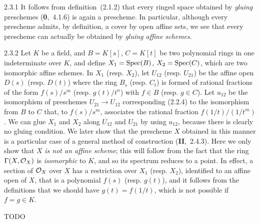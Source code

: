 \documentclass[../main.tex]{subfiles}
\begin{document}
\begin{cx}{2.3.1}
    It follows from definition~(2.1.2) that every ringed space obtained by \emph{gluing} preschemes (\textbf{0},~4.1.6) is again a prescheme.
    In particular, although every prescheme admits, by definition, a cover by open affine sets, we see that every prescheme can actually be obtained by \emph{gluing affine schemes}.
\end{cx}

\begin{cx}[Example]{2.3.2}
    Let $K$ be a field, and $B=K[s]$, $C=K[t]$ be two polynomial rings in one indeterminate over $K$, and define $X_1=\operatorname*{Spec}(B)$, $X_2=\operatorname*{Spec}(C)$, which are two isomorphic affine schemes.
    In $X_1$ (resp. $X_2$), let $U_{12}$ (resp. $U_{21}$) be the affine open $D(s)$ (resp. $D(t)$) where the ring $B_s$ (resp. $C_t$) is formed of rational fractions of the form $f(s)/s^m$ (resp. $g(t)/t^n$) with $f\in B$ (resp. $g\in C$).
    Let $u_{12}$ be the isomorphism of preschemes $U_{21}\to U_{12}$ corresponding (2.2.4) to the isomorphism from $B$ to $C$ that, to $f(s)/s^m$, associates the rational fraction $f(1/t)/(1/t^m)$.
    We can glue $X_1$ and $X_2$ along $U_{12}$ and $U_{21}$ by using $u_{12}$, because there is clearly no gluing condition.
    We later show that the prescheme $X$ obtained in this manner is a particular case of a general method of construction (\textbf{II},~2.4.3).
    Here we only show that $X$ \emph{is not an affine scheme}; this will follow from the fact that the ring $\Gamma(X,\mathcal{O}_X)$ is \emph{isomorphic} to $K$, and so its spectrum reduces to a point.
    In effect, a section of $\mathcal{O}_X$ over $X$ has a restriction over $X_1$ (resp. $X_2$), identified to an affine open of $X$, that is a polynomial $f(s)$ (resp. $g(t)$), and it follows from the definitions that we should have $g(t)=f(1/t)$, which is not possible if $f=g\in K$.
\end{cx}

TODO
\end{document}
